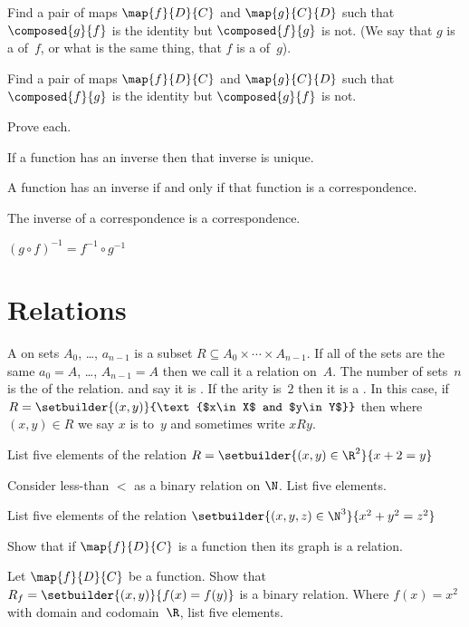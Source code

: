 \documentclass{ibl}
\begin{document}
\begin{ex}
\begin{exes}
\item Find a pair of maps $\map{f}{D}{C}$ and $\map{g}{C}{D}$
  such that $\composed{g}{f}$ is the identity but $\composed{f}{g}$
  is not.
  (We say that $g$ is a  of~$f$, or what is the
  same thing, that $f$ is a  of~$g$).
\item Find a pair of maps $\map{f}{D}{C}$ and $\map{g}{C}{D}$
  such that $\composed{f}{g}$ is the identity but $\composed{g}{f}$
  is not.
\end{exes}
\end{ex}

\begin{ex} Prove each.
\begin{exes}
\item If a function has an inverse then that inverse
  is unique.
\item A function has an inverse if and only if that 
  function is a correspondence.
\item The inverse of a correspondence is a correspondence.  
\item $(g\circ f)^{-1}=f^{-1}\circ g^{-1}$
\end{exes}  
\end{ex}





\section{Relations}
\begin{df}
A  on sets $A_0$, \ldots, $a_{n-1}$ is a subset
$R\subseteq A_0\times \cdots \times A_{n-1}$. 
If all of the sets are the same $a_0=A$, \ldots, $A_{n-1}=A$
then we call it a relation on~$A$.
The number of sets~$n$ is the  of the relation.
and say it is .
If the arity is~$2$ then it is a .
In this case, if $R=\setbuilder{(x,y)}{\text{$x\in X$ and $y\in Y$}}$
then where $(x,y)\in R$ we say $x$ is  to~$y$
and sometimes write $xRy$.
\end{df}

\begin{ex}
\begin{exes}
\item List five elements of the relation
  $R=\setbuilder{(x,y)\in \R^2}{x+2=y}$
\item Consider less-than $<$ as a binary relation on $\N$.
  List five elements.
\item List five elements of the relation
  $\setbuilder{(x,y,z)\in\N^3}{x^2+y^2=z^2}$
\item Show that if $\map{f}{D}{C}$ is a function then 
  its graph is a relation.
\item Let $\map{f}{D}{C}$ be a function.
  Show that 
  $R_f=\setbuilder{(x,y)}{f(x)=f(y)}$
  is a binary relation.
  Where $f(x)=x^2$ with domain and codomain~$\R$,
  list five elements. 
\end{exes}
\end{ex}
\end{document}
